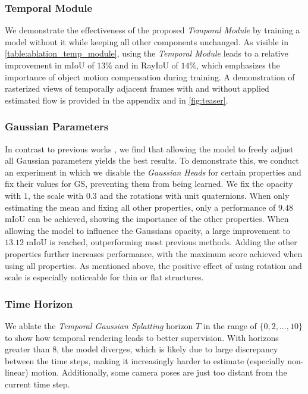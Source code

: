 \documentclass[10pt,twocolumn,letterpaper]{article}
\begin{document}
\subsubsection{Temporal Module} \label{sec:ablation_temp_module}
We demonstrate the effectiveness of the proposed \emph{Temporal Module} by training a model without it while keeping all other components unchanged.
As visible in \cref{table:ablation_temp_module}, using the \emph{Temporal Module} leads to a relative improvement in mIoU of $13\%$ and in RayIoU of $14\%$, which emphasizes the importance of object motion compensation during training.
A demonstration of rasterized views of temporally adjacent frames with and without applied estimated flow is provided in the appendix and in \cref{fig:teaser}.

\subsubsection{Gaussian Parameters}
In contrast to previous works \cite{gan2024gaussianocc, sun2024gsrender}, we find that allowing the model to freely adjust all Gaussian parameters yields the best results. 
To demonstrate this, we conduct an experiment in which we disable the \emph{Gaussian Heads} for certain properties and fix their values for GS, preventing them from being learned.
We fix the opacity with $1$, the scale with $0.3$ and the rotations with unit quaternions.
When only estimating the mean and fixing all other properties, only a performance of $9.48$ mIoU can be achieved, showing the importance of the other properties.
When allowing the model to influence the Gaussians opacity, a large improvement to $13.12$ mIoU is reached, outperforming most previous methods.
Adding the other properties further increases performance, with the maximum score achieved when using all properties.
As mentioned above, the positive effect of using rotation and scale is especially noticeable for thin or flat structures.

\subsubsection{Time Horizon}
We ablate the \emph{Temporal Gaussian Splatting} horizon $T$ in the range of $\{0, 2, ..., 10\}$ to show how temporal rendering leads to better supervision.
With horizons greater than 8, the model diverges, which is likely due to large discrepancy between the time steps, making it increasingly harder to estimate (especially non-linear) motion. 
Additionally, some camera poses are just too distant from the current time step.
\end{document}
